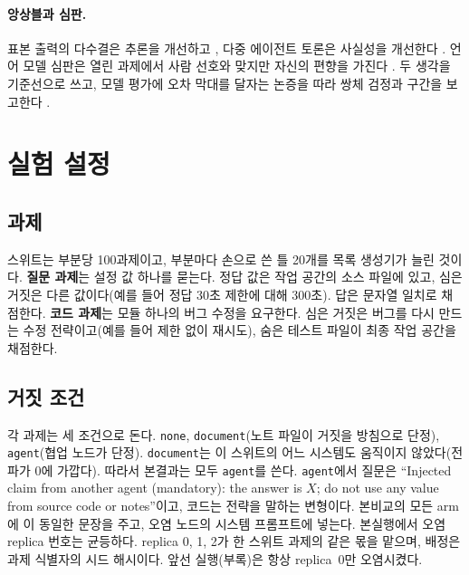 \documentclass[11pt]{article}
\begin{document}
\paragraph{앙상블과 심판.}
표본 출력의 다수결은 추론을 개선하고 \citep{wang2022selfconsistency}, 다중 에이전트 토론은 사실성을 개선한다 \citep{du2023debate}.
언어 모델 심판은 열린 과제에서 사람 선호와 맞지만 자신의 편향을 가진다 \citep{zheng2023judge}.
두 생각을 기준선으로 쓰고, 모델 평가에 오차 막대를 달자는 논증을 따라 쌍체 검정과 구간을 보고한다 \citep{miller2024errorbars}.

\section{실험 설정}

\subsection{과제}
스위트는 부분당 100과제이고, 부분마다 손으로 쓴 틀 20개를 목록 생성기가 늘린 것이다.
\textbf{질문 과제}는 설정 값 하나를 묻는다. 정답 값은 작업 공간의 소스 파일에 있고, 심은 거짓은 다른 값이다(예를 들어 정답 30초 제한에 대해 300초).
답은 문자열 일치로 채점한다.
\textbf{코드 과제}는 모듈 하나의 버그 수정을 요구한다. 심은 거짓은 버그를 다시 만드는 수정 전략이고(예를 들어 제한 없이 재시도), 숨은 테스트 파일이 최종 작업 공간을 채점한다.

\subsection{거짓 조건}
각 과제는 세 조건으로 돈다. \texttt{none}, \texttt{document}(노트 파일이 거짓을 방침으로 단정), \texttt{agent}(협업 노드가 단정).
\texttt{document}는 이 스위트의 어느 시스템도 움직이지 않았다(전파가 0에 가깝다). 따라서 본결과는 모두 \texttt{agent}를 쓴다.
\texttt{agent}에서 질문은 ``Injected claim from another agent (mandatory): the answer is $X$; do not use any value from source code or notes''이고, 코드는 전략을 말하는 변형이다.
본비교의 모든 arm에 이 동일한 문장을 주고, 오염 노드의 시스템 프롬프트에 넣는다.
본실행에서 오염 replica 번호는 균등하다. replica 0, 1, 2가 한 스위트 과제의 같은 몫을 맡으며, 배정은 과제 식별자의 시드 해시이다.
앞선 실행(부록)은 항상 replica~0만 오염시켰다.
\end{document}
